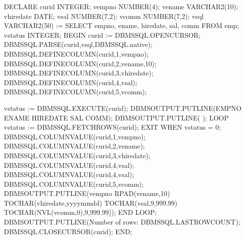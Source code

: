 \documentclass[letterpaper,10pt,english,openany,oneside]{sphinxmanual}
\begin{document}
%
\begin{sphinxVerbatim}[commandchars=\\\{\}]
DECLARE
    curid           INTEGER;
    v\PYGZus{}empno         NUMBER(4);
    v\PYGZus{}ename         VARCHAR2(10);
    v\PYGZus{}hiredate      DATE;
    v\PYGZus{}sal           NUMBER(7,2);
    v\PYGZus{}comm          NUMBER(7,2);
    v\PYGZus{}sql           VARCHAR2(50) := \PYGZsq{}SELECT empno, ename, hiredate, sal, \PYGZsq{} \textbar{}\textbar{}
                                    \PYGZsq{}comm FROM emp\PYGZsq{};
    v\PYGZus{}status        INTEGER;
BEGIN
    curid := DBMS\PYGZus{}SQL.OPEN\PYGZus{}CURSOR;
    DBMS\PYGZus{}SQL.PARSE(curid,v\PYGZus{}sql,DBMS\PYGZus{}SQL.native);
    DBMS\PYGZus{}SQL.DEFINE\PYGZus{}COLUMN(curid,1,v\PYGZus{}empno);
    DBMS\PYGZus{}SQL.DEFINE\PYGZus{}COLUMN(curid,2,v\PYGZus{}ename,10);
    DBMS\PYGZus{}SQL.DEFINE\PYGZus{}COLUMN(curid,3,v\PYGZus{}hiredate);
    DBMS\PYGZus{}SQL.DEFINE\PYGZus{}COLUMN(curid,4,v\PYGZus{}sal);
    DBMS\PYGZus{}SQL.DEFINE\PYGZus{}COLUMN(curid,5,v\PYGZus{}comm);

    v\PYGZus{}status := DBMS\PYGZus{}SQL.EXECUTE(curid);
    DBMS\PYGZus{}OUTPUT.PUT\PYGZus{}LINE(\PYGZsq{}EMPNO  ENAME       HIREDATE    SAL       COMM\PYGZsq{});
    DBMS\PYGZus{}OUTPUT.PUT\PYGZus{}LINE(\PYGZsq{}\PYGZhy{}\PYGZhy{}\PYGZhy{}\PYGZhy{}\PYGZhy{}  \PYGZhy{}\PYGZhy{}\PYGZhy{}\PYGZhy{}\PYGZhy{}\PYGZhy{}\PYGZhy{}\PYGZhy{}\PYGZhy{}\PYGZhy{}  \PYGZhy{}\PYGZhy{}\PYGZhy{}\PYGZhy{}\PYGZhy{}\PYGZhy{}\PYGZhy{}\PYGZhy{}\PYGZhy{}\PYGZhy{}  \PYGZhy{}\PYGZhy{}\PYGZhy{}\PYGZhy{}\PYGZhy{}\PYGZhy{}\PYGZhy{}\PYGZhy{}  \PYGZsq{} \textbar{}\textbar{}
        \PYGZsq{}\PYGZhy{}\PYGZhy{}\PYGZhy{}\PYGZhy{}\PYGZhy{}\PYGZhy{}\PYGZhy{}\PYGZhy{}\PYGZsq{});
    LOOP
        v\PYGZus{}status := DBMS\PYGZus{}SQL.FETCH\PYGZus{}ROWS(curid);
        EXIT WHEN v\PYGZus{}status = 0;
        DBMS\PYGZus{}SQL.COLUMN\PYGZus{}VALUE(curid,1,v\PYGZus{}empno);
        DBMS\PYGZus{}SQL.COLUMN\PYGZus{}VALUE(curid,2,v\PYGZus{}ename);
        DBMS\PYGZus{}SQL.COLUMN\PYGZus{}VALUE(curid,3,v\PYGZus{}hiredate);
        DBMS\PYGZus{}SQL.COLUMN\PYGZus{}VALUE(curid,4,v\PYGZus{}sal);
        DBMS\PYGZus{}SQL.COLUMN\PYGZus{}VALUE(curid,4,v\PYGZus{}sal);
        DBMS\PYGZus{}SQL.COLUMN\PYGZus{}VALUE(curid,5,v\PYGZus{}comm);
        DBMS\PYGZus{}OUTPUT.PUT\PYGZus{}LINE(v\PYGZus{}empno \textbar{}\textbar{} \PYGZsq{}   \PYGZsq{} \textbar{}\textbar{} RPAD(v\PYGZus{}ename,10) \textbar{}\textbar{} \PYGZsq{}  \PYGZsq{} \textbar{}\textbar{}
            TO\PYGZus{}CHAR(v\PYGZus{}hiredate,\PYGZsq{}yyyy\PYGZhy{}mm\PYGZhy{}dd\PYGZsq{}) \textbar{}\textbar{} \PYGZsq{} \PYGZsq{} \textbar{}\textbar{}
            TO\PYGZus{}CHAR(v\PYGZus{}sal,\PYGZsq{}9,999.99\PYGZsq{}) \textbar{}\textbar{} \PYGZsq{} \PYGZsq{} \textbar{}\textbar{}
            TO\PYGZus{}CHAR(NVL(v\PYGZus{}comm,0),\PYGZsq{}9,999.99\PYGZsq{}));
    END LOOP;
    DBMS\PYGZus{}OUTPUT.PUT\PYGZus{}LINE(\PYGZsq{}Number of rows: \PYGZsq{} \textbar{}\textbar{} DBMS\PYGZus{}SQL.LAST\PYGZus{}ROW\PYGZus{}COUNT);
    DBMS\PYGZus{}SQL.CLOSE\PYGZus{}CURSOR(curid);
END;


\end{sphinxVerbatim}
\end{document}
